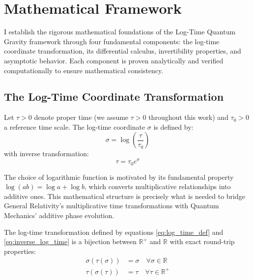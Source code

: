 \section{Mathematical Framework}
\label{sec:mathematical_framework}

I establish the rigorous mathematical foundations of the Log-Time Quantum Gravity framework through four fundamental components: the log-time coordinate transformation, its differential calculus, invertibility properties, and asymptotic behavior. Each component is proven analytically and verified computationally to ensure mathematical consistency.

\subsection{The Log-Time Coordinate Transformation}
\label{subsec:log_time_transformation}

\begin{definition}
Let $\tau > 0$ denote proper time (we assume $\tau > 0$ throughout this work) and $\tau_0 > 0$ a reference time scale. The log-time coordinate $\sigma$ is defined by:
\begin{equation}
\sigma = \log\left(\frac{\tau}{\tau_0}\right)
\label{eq:log_time_def}
\end{equation}
with inverse transformation:
\begin{equation}
\tau = \tau_0 e^\sigma
\label{eq:inverse_log_time}
\end{equation}
\end{definition}

The choice of logarithmic function is motivated by its fundamental property $\log(ab) = \log a + \log b$, which converts multiplicative relationships into additive ones. This mathematical structure is precisely what is needed to bridge General Relativity's multiplicative time transformations with Quantum Mechanics' additive phase evolution.

\begin{theorem}
\label{thm:invertibility}
The log-time transformation defined by equations \eqref{eq:log_time_def} and \eqref{eq:inverse_log_time} is a bijection between $\mathbb{R}^+$ and $\mathbb{R}$ with exact round-trip properties:
\begin{align}
\sigma(\tau(\sigma)) &= \sigma \quad \forall \sigma \in \mathbb{R} \\
\tau(\sigma(\tau)) &= \tau \quad \forall \tau \in \mathbb{R}^+
\end{align}
\end{theorem}

